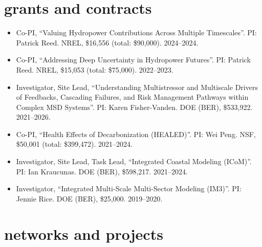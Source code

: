 \documentclass[11pt,article,oneside]{memoir}
\begin{document}

\section{grants and contracts}

\mbox{}\vspace{-\dimexpr\baselineskip\relax}

\begin{itemize}[label={}]

\item Co-PI, \enquote{Valuing Hydropower Contributions Across Multiple Timescales}.  PI: Patrick Reed. NREL, \$16,556 (total: \$90,000). 2024--2024.

\item Co-PI, \enquote{Addressing Deep Uncertainty in Hydropower Futures}.  PI: Patrick Reed. NREL, \$15,053 (total: \$75,000). 2022--2023.

\item Investigator, Site Lead, \enquote{Understanding Multistressor and Multiscale Drivers of Feedbacks, Cascading Failures, and Risk Management Pathways within Complex MSD Systems}.  PI: Karen Fisher-Vanden. DOE (BER), \$533,922. 2021--2026.

\item Co-PI, \enquote{Health Effects of Decarbonization (HEALED)}.  PI: Wei Peng. NSF, \$50,001 (total: \$399,472). 2021--2024.

\item Investigator, Site Lead, Task Lead, \enquote{Integrated Coastal Modeling (ICoM)}.  PI: Ian Kraucunas. DOE (BER), \$598,217. 2021--2024.

\item Investigator, \enquote{Integrated Multi-Scale Multi-Sector Modeling (IM3)}.  PI: Jennie Rice. DOE (BER), \$25,000. 2019--2020.

\end{itemize}


\section{networks and projects}

\mbox{}\vspace{-\dimexpr\baselineskip\relax}
\end{document}
